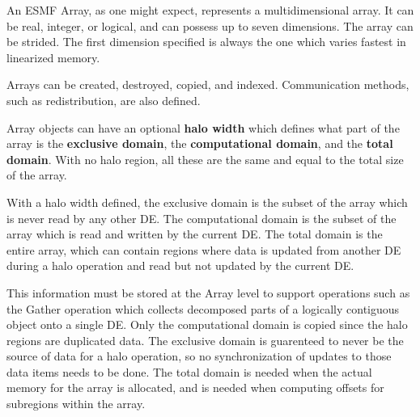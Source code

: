 

An ESMF Array, as one might expect, represents a multidimensional array.
It can be real, integer, or logical, and can possess up to seven 
dimensions.  The array can be strided.  The first dimension specified 
is always the one which varies fastest in linearized memory. 

Arrays can be created, destroyed, copied, and indexed.  Communication
methods, such as redistribution, are also defined.

Array objects can have an optional {\bf halo width} which defines
what part of the array is the {\bf exclusive domain}, the {\bf computational
domain}, and the {\bf total domain}.  With no halo region, all these are
the same and equal to the total size of the array.  

With a halo width defined, the exclusive domain is the subset of the
array which is never read by any other DE.  The computational domain
is the subset of the array which is read and written by the current DE.
The total domain is the entire array, which can contain regions where
data is updated from another DE during a halo operation and read but 
not updated by the current DE.  

This information must be stored at the Array level to
support operations such as the Gather operation which collects
decomposed parts of a logically contiguous object onto a single DE.
Only the computational domain is copied since the halo regions are
duplicated data.  The exclusive domain is guarenteed to never be
the source of data for a halo operation, so no synchronization
of updates to those data items needs to be done.  The total
domain is needed when the actual memory for the array is allocated,
and is needed when computing offsets for subregions within the array.


